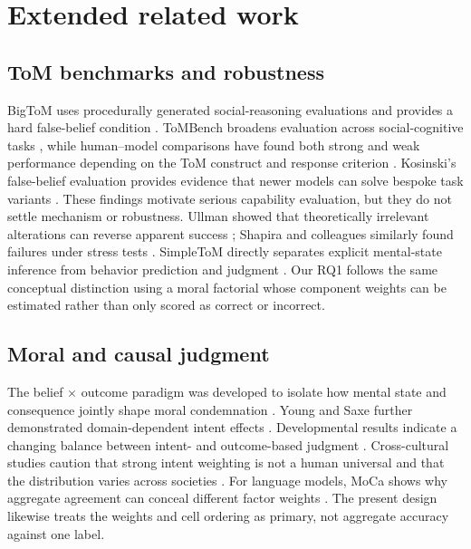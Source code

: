 
\section{Extended related work}

\subsection{ToM benchmarks and robustness}

BigToM uses procedurally generated social-reasoning evaluations and provides a hard false-belief condition \citep{gandhi2023bigtom}.
ToMBench broadens evaluation across social-cognitive tasks \citep{chen2024tombench}, while human--model comparisons have found both strong and weak performance depending on the ToM construct and response criterion \citep{strachan2024testing}.
Kosinski's false-belief evaluation provides evidence that newer models can solve bespoke task variants \citep{kosinski2024evaluating}.
These findings motivate serious capability evaluation, but they do not settle mechanism or robustness.
Ullman showed that theoretically irrelevant alterations can reverse apparent success \citep{ullman2023alterations}; Shapira and colleagues similarly found failures under stress tests \citep{shapira2024clever}.
SimpleToM directly separates explicit mental-state inference from behavior prediction and judgment \citep{gu2026simpletom}.
Our RQ1 follows the same conceptual distinction using a moral factorial whose component weights can be estimated rather than only scored as correct or incorrect.

\subsection{Moral and causal judgment}

The belief $\times$ outcome paradigm was developed to isolate how mental state and consequence jointly shape moral condemnation \citep{young2007neural,young2008belief,young2009innocent}.
Young and Saxe further demonstrated domain-dependent intent effects \citep{young2011ignorance}.
Developmental results indicate a changing balance between intent- and outcome-based judgment \citep{cushman2013development}.
Cross-cultural studies caution that strong intent weighting is not a human universal and that the distribution varies across societies \citep{barrett2016societies,curtin2020kinship}.
For language models, MoCa shows why aggregate agreement can conceal different factor weights \citep{nie2023moca}.
The present design likewise treats the weights and cell ordering as primary, not aggregate accuracy against one label.

